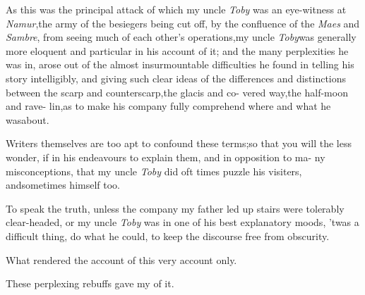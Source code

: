 \documentclass{article}
\begin{document}
As this was the principal attack of which my uncle \textit{Toby}
was an eye-witness at \textit{Namur},\tsh the army of the
besiegers being cut off, by the confluence of the \textit{Maes}
and \textit{Sambre}, from seeing much of each other’s
operations,\tsk my uncle \textit{Toby}\break was generally more
eloquent and parti\-cular in his account of it; and the many
perplexities he was in, arose out of the\break
almost insurmountable difficulties he\break
found in telling his story intelligibly,\break
and giving such clear ideas of the differences and distinctions
between the scarp 
and counterscarp,\tsh the glacis and co-\break
vered way,\tsh the half-moon and rave-\break
lin,\tsh as to make his company fully\break
comprehend where and what he was\break about.

Writers themselves are too apt to confound these terms;\tsh so that
you will the less wonder, if in his endeavours to explain them, and
in opposition to ma- ny misconceptions, that my uncle \textit{Toby} did
oft times puzzle his visiters, and\break sometimes himself too.

To speak the truth, unless the compa\-ny my father led up stairs
were tolerably clear-headed, or my uncle \textit{Toby} was in one of
his best explanatory moods, ’twas a difficult thing, do what he could, to keep the
discourse free from obscurity.

What rendered the account of this\break
{}
very account only.

These perplexing rebuffs gave my\break
{}
of it.
\end{document}
